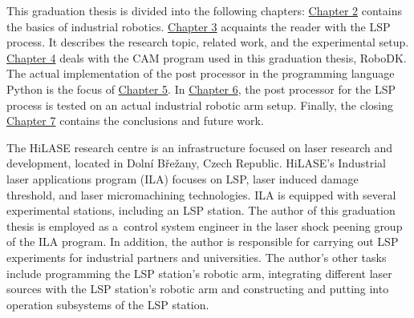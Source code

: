 This graduation thesis is divided into the following chapters: \hyperref[chap:basics]{Chapter 2} contains the basics of industrial robotics. \hyperref[chap:peening]{Chapter 3} acquaints the reader with the LSP process.  It describes the research topic, related work, and the experimental setup.  
\hyperref[chap:design]{Chapter 4} deals with the CAM program used in this graduation thesis, RoboDK. The actual implementation of the post processor in the programming language Python is the focus of \hyperref[chap:implementation]{Chapter 5}. In \hyperref[chap:testing]{Chapter 6}, the post processor for the LSP process is tested on an actual industrial robotic arm setup. Finally, the closing \hyperref[chap:discussion]{Chapter 7} contains the conclusions and future work. 

The HiLASE research centre is an infrastructure focused on laser research and development, located in Dolní Břežany, Czech Republic. HiLASE's Industrial laser applications program (ILA) focuses on LSP, laser induced damage threshold, and laser micromachining technologies. ILA is equipped with several experimental stations, including an LSP station. The author of this graduation thesis is employed as a~control system engineer in the laser shock peening group of the ILA program. In addition, the author is responsible for carrying out LSP experiments for industrial partners and universities. The author's other tasks include programming the LSP station's robotic arm, integrating different laser sources with the  LSP station's robotic arm and constructing and putting into operation subsystems of the LSP station.




